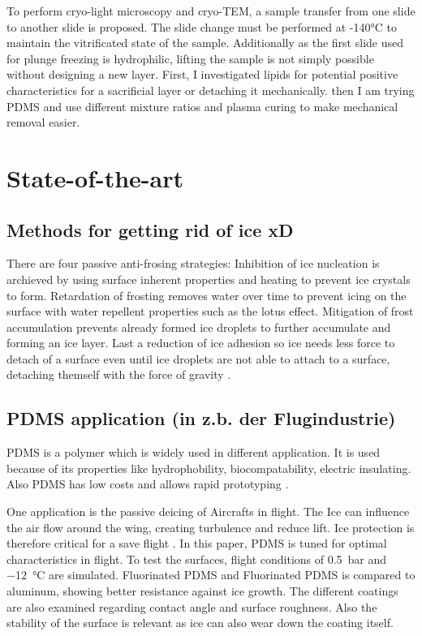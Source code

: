 To perform cryo-light microscopy and cryo-TEM, a sample transfer from one slide to another slide is proposed. The slide change must be performed at -140°C to maintain the vitrificated state of the sample. Additionally as the first slide used for plunge freezing is hydrophilic, lifting the sample is not simply possible without designing a new layer. First, I investigated lipids for potential positive characteristics for a sacrificial layer or detaching it mechanically. then I am trying PDMS and use different mixture ratios and plasma curing to make mechanical removal easier.


\section{State-of-the-art}

\subsection{Methods for getting rid of ice xD}

There are four passive anti-frosing strategies: Inhibition of ice nucleation is archieved by using surface inherent properties and heating to prevent ice crystals to form. Retardation of frosting removes water over time to prevent icing on the surface with water repellent properties such as the lotus effect. Mitigation of frost accumulation prevents already formed ice droplets to further accumulate and forming an ice layer. Last a reduction of ice adhesion so ice needs less force to detach of a surface even until ice droplets are not able to attach to a surface, detaching themself with the force of gravity \cite{Yang.2021}. 

\subsection{PDMS application (in z.b. der Flugindustrie)}

PDMS is a polymer which is widely used in different application. It is used because of its properties like hydrophobility, biocompatability, electric insulating. Also PDMS has low costs and allows rapid prototyping \cite{Wolf.2018}. 

One application is the passive deicing of Aircrafts in flight. The Ice can influence the air flow around the wing, creating turbulence and reduce lift. Ice protection is therefore critical for a save flight \cite{Liu.2018}. In this paper, PDMS is tuned for optimal characteristics in flight. To test the surfaces, flight conditions of \SI{0.5}{\bar} and \SI{-12}{\degreeCelsius} are simulated. Fluorinated PDMS and Fluorinated PDMS is compared to aluminum, showing better resistance against ice growth. The different coatings are also examined regarding contact angle and surface roughness. Also the stability of the surface is relevant as ice can also wear down the coating itself.  



